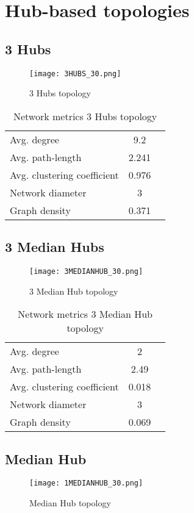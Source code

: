 \documentclass[Bachelorarbeit.tex]{subfiles}
\begin{document}
\section{Hub-based topologies}
\subsection{3 Hubs}
\begin{figure}[H]
	\centering
  \texttt{[image: 3HUBS\_30.png]}
	\caption{3 Hubs topology}
	\label{fig:topology_3HUBS_30}
\end{figure}

\begin{table}[h]
	\centering
	\caption{Network metrics 3 Hubs topology}
	\begin{tabular} { l c r }
		\hline
		Avg. degree & 9.2 \\
		Avg. path-length & 2.241 \\
		Avg. clustering coefficient & 0.976 \\
		Network diameter & 3 \\
		Graph density & 0.371\\
		\hline
	\end{tabular}
\end{table}

\subsection{3 Median Hubs}
\begin{figure}[H]
	\centering
  \texttt{[image: 3MEDIANHUB\_30.png]}
	\caption{3 Median Hub topology}
	\label{fig:topology_3MEDIANHUB_30}
\end{figure}

\begin{table}[h]
	\centering
	\caption{Network metrics 3 Median Hub topology}
	\begin{tabular} { l c r }
		\hline
		Avg. degree & 2 \\
		Avg. path-length & 2.49 \\
		Avg. clustering coefficient & 0.018 \\
		Network diameter & 3 \\
		Graph density & 0.069 \\
		\hline
	\end{tabular}
\end{table}

\subsection{Median Hub}
\begin{figure}[H]
	\centering
  \texttt{[image: 1MEDIANHUB\_30.png]}
	\caption{Median Hub topology}
	\label{fig:topology_1MEDIANHUB_30}
\end{figure}
\end{document}
